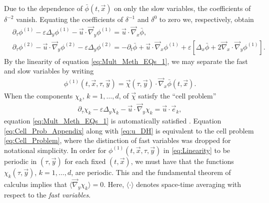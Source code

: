 \documentclass[11pt]{amsart}
\begin{document}
Due to the dependence of $\bar{\phi}(t,\vec{x})$ on only the
slow variables, the coefficients of $\delta^{-2}$ vanish. Equating the
coefficients of $\delta^{-1}$ and $\delta^0$ to zero we, respectively, obtain 
%
\begin{align}
  \label{eq:Mult_Meth_EQs_1}
  &\partial_\tau\phi^{(1)}-\varepsilon\Delta_y\phi^{(1)}-\vec{u}\cdot\vec{\nabla}_y\phi^{(1)}=\vec{u}\cdot\vec{\nabla}_x\bar{\phi},
  \\
  \label{eq:Mult_Meth_EQs_2}
  &\partial_\tau\phi^{(2)}-\vec{u}\cdot\vec{\nabla}_y\phi^{(2)}-\varepsilon\Delta_y\phi^{(2)}
  =-\partial_t\bar{\phi}+\vec{u}\cdot\vec{\nabla}_x\phi^{(1)}+\varepsilon[\Delta_x\bar{\phi}+2\vec{\nabla}_x\cdot\vec{\nabla}_y\phi^{(1)}].
\end{align}
%
By the linearity of equation \eqref{eq:Mult_Meth_EQs_1}, we may
separate the fast and slow variables by writing
\cite{McLaughlin:SIAM_JAM:780}
%
\begin{align}\label{eq:Linearity}
  \phi^{(1)}(t,\vec{x},\tau,\vec{y})
    =%
    \vec{\chi}(\tau,\vec{y})\cdot\vec{\nabla}_x\bar{\phi}(t,\vec{x}).
\end{align}
%
When
the components $\chi_k$, $k=1,\ldots,d$, of $\vec{\chi}$ satisfy the ``cell
problem''  
%
\begin{align}\label{eq:Cell_Prob_Appendix}
  \partial_\tau\chi_k-\varepsilon\Delta_y\chi_k-\vec{u}\cdot\vec{\nabla}_y\chi_k=\vec{u}\cdot\vec{e}_k,
\end{align}
%
equation \eqref{eq:Mult_Meth_EQs_1} is automatically satisfied
\cite{McLaughlin:SIAM_JAM:780}. Equation \eqref{eq:Cell_Prob_Appendix}
along with \eqref{eq:u_DH} is equivalent to the cell problem
\eqref{eq:Cell_Problem}, where the distinction of fast variables was
dropped for notational simplicity. In order for
$\phi^{(1)}(t,\vec{x},\tau,\vec{y})$ in \eqref{eq:Linearity} to be periodic  
in $(\tau,\vec{y})$ for each fixed $(t,\vec{x})$, we must have that the
functions $\chi_k(\tau,\vec{y})$, $k=1,\ldots,d$, are periodic. This and the
fundamental theorem of calculus implies that $\langle\vec{\nabla}_y\chi_k\rangle=0$. Here,
$\langle\cdot\rangle$ denotes space-time averaging with respect to the \emph{fast
  variables}.    
\end{document}
